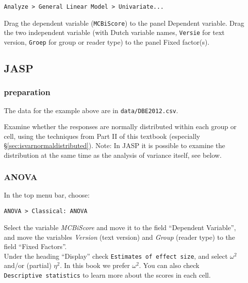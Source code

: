 \documentclass[
]{book}
\begin{document}
\begin{verbatim}
Analyze > General Linear Model > Univariate...
\end{verbatim}

Drag the dependent variable (\texttt{MCBiScore}) to the panel Dependent
variable. Drag the two independent variable (with Dutch variable names, \texttt{Versie} for text version, \texttt{Groep} for group or reader type) to the panel Fixed factor(s).

\hypertarget{jasp-14}{%
\subsection{JASP}\label{jasp-14}}

\hypertarget{preparation-4}{%
\subsubsection{preparation}\label{preparation-4}}

The data for the example above are in \texttt{data/DBE2012.csv}.

Examine whether the responses are normally distributed within each group or cell, using the
techniques from Part II of this textbook (especially
§\ref{sec:isvarnormaldistributed}).
Note: In JASP it is possible to examine the distribution at the same time as the analysis of variance itself, see below.

\hypertarget{anova-4}{%
\subsubsection{ANOVA}\label{anova-4}}

In the top menu bar, choose:

\begin{verbatim}
ANOVA > Classical: ANOVA
\end{verbatim}

Select the variable \emph{MCBiScore} and move it to the field ``Dependent Variable'', and move the variables \emph{Version} (text version) and \emph{Group} (reader type) to the field ``Fixed Factors''.\\
Under the heading ``Display'' check \texttt{Estimates\ of\ effect\ size}, and select \(\omega^2\) and/or (partial) \(\eta^2\). In this book we prefer \(\omega^2\).
You can also check \texttt{Descriptive\ statistics} to learn more about the scores in each cell.
\end{document}
